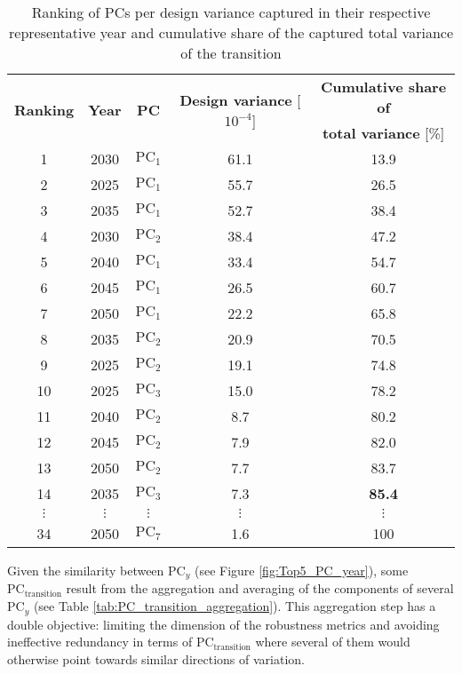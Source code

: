\begin{table}[htbp!]
\caption{Ranking of \gls{PCs} per design variance captured in their respective representative year and cumulative share of the captured total variance of the transition}
\label{tab:ranking_PCs}
\centering
\begin{tabular}{c c c c c}
\toprule
\multirow{2}{*}{\textbf{Ranking}} & \multirow{2}{*}{\textbf{Year}}  & \multirow{2}{*}{\textbf{PC}} & \multirow{2}{*}{\textbf{Design variance} [$10^{-4}$]} & \textbf{Cumulative share of} \\	
 &   &  &  & \textbf{total variance} [\%] \\	
 \midrule	
1 & 2030 & $\text{PC}_1$ & 61.1 & 13.9 \\
2 & 2025 & $\text{PC}_1$ & 55.7 & 26.5 \\
3 & 2035 & $\text{PC}_1$ & 52.7 & 38.4 \\
4 & 2030 & $\text{PC}_2$ & 38.4 & 47.2 \\
5 & 2040 & $\text{PC}_1$ & 33.4 & 54.7 \\
6 & 2045 & $\text{PC}_1$ & 26.5 & 60.7 \\
7 & 2050 & $\text{PC}_1$ & 22.2 & 65.8 \\
8 & 2035 & $\text{PC}_2$ & 20.9 & 70.5 \\
9 & 2025 & $\text{PC}_2$ & 19.1 & 74.8 \\
10 & 2025 & $\text{PC}_3$ & 15.0 & 78.2 \\
11 & 2040 & $\text{PC}_2$ & 8.7 & 80.2 \\
12 & 2045 & $\text{PC}_2$ & 7.9 & 82.0 \\
13 & 2050 & $\text{PC}_2$ & 7.7 & 83.7 \\
14 & 2035 & $\text{PC}_3$ & 7.3 & \textbf{85.4} \\
$\vdots$ & $\vdots$ & $\vdots$ & $\vdots$ & $\vdots$\\
34 & 2050 & $\text{PC}_7$ & 1.6 & 100 \\
\bottomrule							

\end{tabular}
\end{table}

Given the similarity between $\text{PC}_y$ (see Figure \ref{fig:Top5_PC_year}), some $\text{PC}_{\text{transition}}$ result from the aggregation and averaging of the components of several $\text{PC}_y$ (see Table \ref{tab:PC_transition_aggregation}). This aggregation step has a double objective: limiting the dimension of the robustness metrics and avoiding ineffective redundancy in terms of $\text{PC}_{\text{transition}}$ where several of them would otherwise point towards similar directions of variation.


